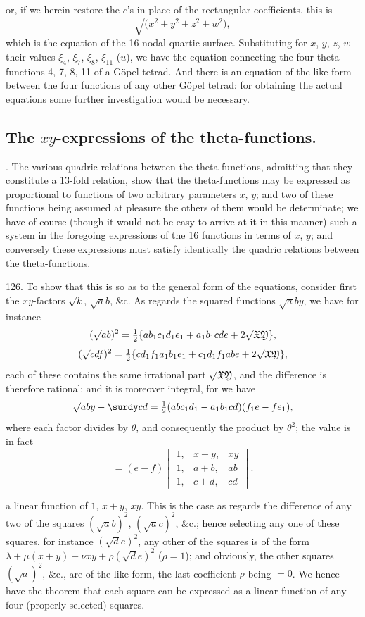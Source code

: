 \documentclass[12pt]{article}
\theoremstyle{plain}
\begin{document}
\setcounter{page}{551}

\noindent
or, if we herein restore the $c$'s in place of the rectangular coefficients, this is
\[
\surd(x^2 + y^2 + z^2 + w^2),
\]
which is the equation of the 16-nodal quartic surface. Substituting for $x$, $y$, $z$, $w$ their values $\xi_4$, $\xi_7$, $\xi_8$, $\xi_{11}$ ($u$), we have the equation connecting the four theta-functions 4, 7, 8, 11 of a G\"opel tetrad. And there is an equation of the like form between the four functions of any other G\"opel tetrad: for obtaining the actual equations some further investigation would be necessary.

\subsection*{The $xy$-expressions of the theta-functions.}

. The various quadric relations between the theta-functions, admitting that they constitute a 13-fold relation, show that the theta-functions may be expressed as proportional to functions of two arbitrary parameters $x$, $y$; and two of these functions being assumed at pleasure the others of them would be determinate; we have of course (though it would not be easy to arrive at it in this manner) such a system in the foregoing expressions of the 16 functions in terms of $x$, $y$; and conversely these expressions must satisfy identically the quadric relations between the theta-functions.

126. To show that this is so as to the general form of the equations, consider first the $xy$-factors $\surd k$, $\surd ab$, \&c. As regards the squared functions $\surd aby$, we have for instance
\[
(\surd ab)^2 = \tfrac12 \{ab_1 c_1 d_1 e_1 + a_1 b_1 cde + 2\surd\mathfrak{XY}\},
\]
\[
(\surd cdf)^2 = \tfrac12 \{cd_1 f_1 a_1 b_1 e_1 + c_1 d_1 f_1 abe + 2\surd\mathfrak{XY}\},
\]
each of these contains the same irrational part $\surd\mathfrak{XY}$, and the difference is therefore rational: and it is moreover integral, for we have
\[
\surd aby - \surdy cd = \tfrac12 (abc_1 d_1 - a_1 b_1 cd)(f_1 e - f e_1),
\]
where each factor divides by $\theta$, and consequently the product by $\theta^2$; the value is in fact
\[
= (e - f)
\begin{vmatrix}
1, & x + y, & xy \\
1, & a + b, & ab \\
1, & c + d, & cd
\end{vmatrix}.
\]

\noindent
a linear function of $1$, $x + y$, $xy$. This is the case as regards the difference of any two of the squares $(\surd ab)^2$, $(\surd ac)^2$, \&c.; hence selecting any one of these squares, for instance $(\surd de)^2$, any other of the squares is of the form $\lambda + \mu(x + y) + \nu xy + \rho(\surd de)^2$ ($\rho = 1$); and obviously, the other squares $(\surd a)^2$, \&c., are of the like form, the last coefficient $\rho$ being $=0$. We hence have the theorem that each square can be expressed as a linear function of any four (properly selected) squares.
\end{document}
